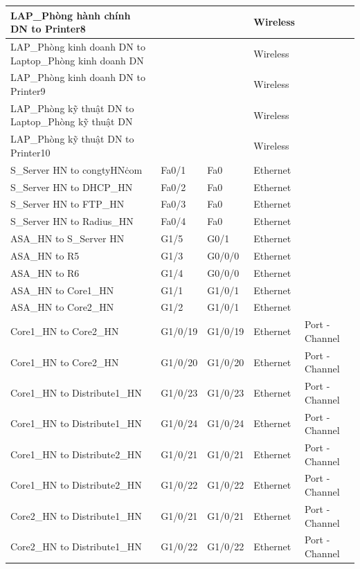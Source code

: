 \documentclass[12pt,a4paper]{report}
\begin{document}
\begin{center}
\begin{longtable}{|p{}|p{}|p{}|p{}|p{}|}
\hline  LAP\_Phòng hành chính DN  to  Printer8  &    &    &  Wireless  &   \\
\hline  LAP\_Phòng kinh doanh DN  to  Laptop\_Phòng kinh doanh DN  &    &    &  Wireless  &   \\
\hline  LAP\_Phòng kinh doanh DN  to  Printer9  &    &    &  Wireless  &   \\
\hline  LAP\_Phòng kỹ thuật DN  to  Laptop\_Phòng kỹ thuật DN  &    &    &  Wireless  &   \\
\hline  LAP\_Phòng kỹ thuật DN  to  Printer10  &    &    &  Wireless  &   \\
\hline  S\_Server HN  to  congtyHN\.com  &  Fa0/1  &  Fa0  &  Ethernet  &   \\
\hline  S\_Server HN  to  DHCP\_HN  &  Fa0/2  &  Fa0  &  Ethernet  &   \\
\hline  S\_Server HN  to  FTP\_HN  &  Fa0/3  &  Fa0  &  Ethernet  &   \\
\hline  S\_Server HN  to  Radius\_HN  &  Fa0/4  &  Fa0  &  Ethernet  &   \\
\hline  ASA\_HN  to  S\_Server HN  &  G1/5  &  G0/1  &  Ethernet  &   \\
\hline  ASA\_HN  to  R5  &  G1/3  &  G0/0/0  &  Ethernet  &   \\
\hline  ASA\_HN  to  R6  &  G1/4  &  G0/0/0  &  Ethernet  &   \\
\hline  ASA\_HN  to  Core1\_HN  &  G1/1  &  G1/0/1  &  Ethernet  &   \\
\hline  ASA\_HN  to  Core2\_HN  &  G1/2  &  G1/0/1  &  Ethernet  &   \\
\hline  Core1\_HN  to  Core2\_HN  &  G1/0/19  &  G1/0/19  &  Ethernet  &  Port - Channel \\
\hline  Core1\_HN  to  Core2\_HN  &  G1/0/20  &  G1/0/20  &  Ethernet  &  Port - Channel \\
\hline  Core1\_HN  to  Distribute1\_HN  &  G1/0/23  &  G1/0/23  &  Ethernet  &  Port - Channel \\
\hline  Core1\_HN  to  Distribute1\_HN  &  G1/0/24  &  G1/0/24  &  Ethernet  &  Port - Channel \\
\hline  Core1\_HN  to  Distribute2\_HN  &  G1/0/21  &  G1/0/21  &  Ethernet  &  Port - Channel \\
\hline  Core1\_HN  to  Distribute2\_HN  &  G1/0/22  &  G1/0/22  &  Ethernet  &  Port - Channel \\
\hline  Core2\_HN  to  Distribute1\_HN  &  G1/0/21  &  G1/0/21  &  Ethernet  &  Port - Channel \\
\hline  Core2\_HN  to  Distribute1\_HN  &  G1/0/22  &  G1/0/22  &  Ethernet  &  Port - Channel \\

\end{longtable}
\end{center}
\end{document}
